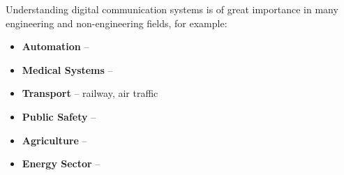 Understanding digital communication systems is of great importance in many engineering and non-engineering fields, for example:
\begin{itemize}
	\item \textbf{Automation} -- 
	\item \textbf{Medical Systems} -- 
	\item \textbf{Transport} -- railway, air traffic
	\item \textbf{Public Safety} -- 
	\item \textbf{Agriculture} -- 
	\item \textbf{Energy Sector} -- 
\end{itemize}

